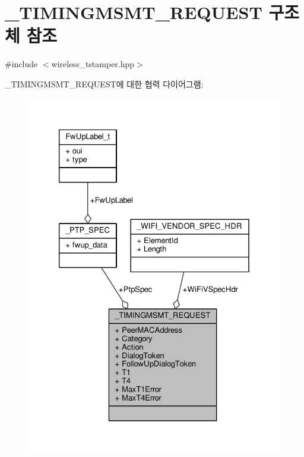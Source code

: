 \hypertarget{struct___t_i_m_i_n_g_m_s_m_t___r_e_q_u_e_s_t}{}\section{\+\_\+\+T\+I\+M\+I\+N\+G\+M\+S\+M\+T\+\_\+\+R\+E\+Q\+U\+E\+ST 구조체 참조}
\label{struct___t_i_m_i_n_g_m_s_m_t___r_e_q_u_e_s_t}


{\ttfamily \#include $<$wireless\+\_\+tstamper.\+hpp$>$}



\+\_\+\+T\+I\+M\+I\+N\+G\+M\+S\+M\+T\+\_\+\+R\+E\+Q\+U\+E\+S\+T에 대한 협력 다이어그램\+:
\nopagebreak
\begin{figure}[H]
\begin{center}
\leavevmode
\includegraphics[width=326pt]{struct___t_i_m_i_n_g_m_s_m_t___r_e_q_u_e_s_t__coll__graph}
\end{center}
\end{figure}
